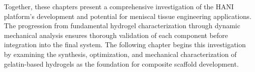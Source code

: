Together, these chapters present a comprehensive investigation of the HANI platform's development and potential for meniscal tissue engineering applications. The progression from fundamental hydrogel characterization through dynamic mechanical analysis ensures thorough validation of each component before integration into the final system. The following chapter begins this investigation by examining the synthesis, optimization, and mechanical characterization of gelatin-based hydrogels as the foundation for composite scaffold development.

